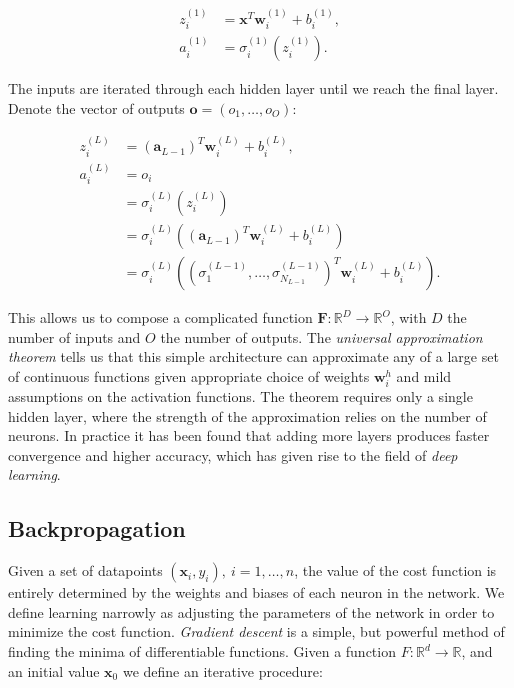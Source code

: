 \begin{equation}
\begin{split}
    z_i^{(1)} &= \bm{x}^T \bm{w}_i^{(1)} + b_i^{(1)} , \\
    a_i^{(1)} &= \sigma_i^{(1)}(z_i^{(1)}) . 
\end{split}
\end{equation}

The inputs are iterated through each hidden layer until we reach the final layer.
Denote the vector of outputs $\bm{o} = \left(o_1,\dots,o_O\right)$:

\begin{equation}
\begin{split}
    z_i^{(L)} &= (\bm{a}_{L-1})^T \bm{w}_i^{(L)} + b_i^{(L)} , \\
    a_i^{(L)} &= o_i \\
              &= \sigma_i^{(L)}(z_i^{(L)}) \\
    &= \sigma_i^{(L)} \left((\bm{a}_{L-1})^T \bm{w}_i^{(L)} + b_i^{(L)} \right) \\
    &= \sigma_i^{(L)} \left(
    \left( \sigma_1^{(L-1)},\dots,\sigma_{N_{L-1}}^{(L-1)} \right)^T
    \bm{w}_i^{(L)} + b_i^{(L)} \right) .
\end{split}
\end{equation}

This allows us to compose a complicated function $\bm{F}: \mathbb{R}^D \rightarrow
\mathbb{R}^O$, with $D$ the number of inputs and $O$ the number of outputs.
The \textit{universal approximation theorem} tells us that this simple architecture
can approximate any of a large set of continuous functions
given appropriate choice of weights $\bm{w}_i^h$ and mild assumptions
on the activation functions. The theorem requires only a single hidden layer,
where the strength of the approximation relies on the number of neurons.
In practice it has been found that adding more layers produces
faster convergence and higher accuracy, which has given rise
to the field of \textit{deep learning}.

\subsection{Backpropagation}
Given a set of datapoints $(\bm{x}_i, y_i), \ i=1,\dots,n$,
the value of the cost function is entirely determined
by the weights and biases of each neuron in the network.
We define learning narrowly as adjusting the parameters of the network
in order to minimize the cost function.
\newline
\textit{Gradient descent} is a simple, but powerful method
of finding the minima of differentiable functions.
Given a function $F: \mathbb{R}^d \rightarrow \mathbb{R}$, and an initial
value $\bm{x}_0$ we define an iterative procedure:


